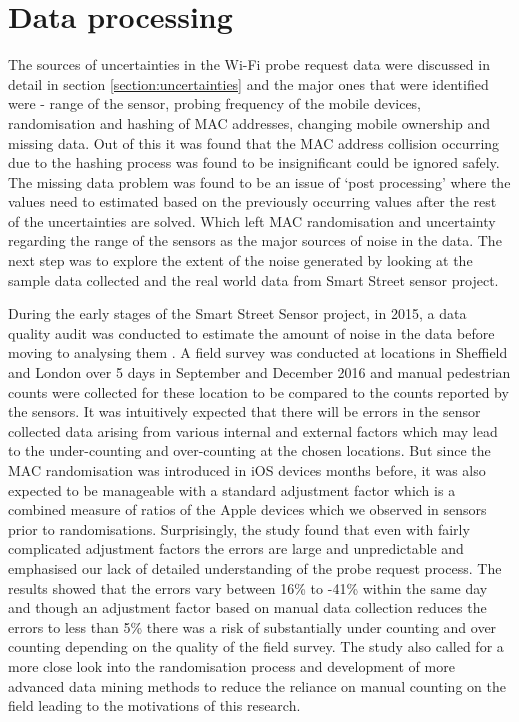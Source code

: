 \section{Data processing} \label{section:processing}

The sources of uncertainties in the Wi-Fi probe request data were discussed in detail in section \ref{section:uncertainties} and the major ones that were identified were - range of the sensor, probing frequency of the mobile devices, randomisation and hashing of MAC addresses, changing mobile ownership and missing data.
Out of this it was found that the MAC address collision occurring due to the hashing process was found to be insignificant could be ignored safely.
The missing data problem was found to be an issue of `post processing' where the values need to estimated based on the previously occurring values after the rest of the uncertainties are solved.
Which left MAC randomisation and uncertainty regarding the range of the sensors as the major sources of noise in the data.
The next step was to explore the extent of the noise generated by looking at the sample data collected and the real world data from Smart Street sensor project.

During the early stages of the Smart Street Sensor project, in 2015, a data quality audit was conducted to estimate the amount of noise in the data before moving to analysing them \cite{lugomer2017}.
A field survey was conducted at locations in Sheffield and London over 5 days in September and December 2016 and manual pedestrian counts were collected for these location to be compared to the counts reported by the sensors.
It was intuitively expected that there will be errors in the sensor collected data arising from various internal and external factors which may lead to the under-counting and over-counting at the chosen locations.
But since the MAC randomisation was introduced in iOS devices months before, it was also expected to be manageable with a standard adjustment factor which is a combined measure of ratios of the Apple devices which we observed in sensors prior to randomisations.
Surprisingly, the study found that even with fairly complicated adjustment factors the errors are large and unpredictable and emphasised our lack of detailed understanding of the probe request process.
The results showed that the errors vary between 16\% to -41\% within the same day and though an adjustment factor based on manual data collection reduces the errors to less than 5\% there was a risk of substantially under counting and over counting depending on the quality of the field survey.
The study also called for a more close look into the randomisation process and development of more advanced data mining methods to reduce the reliance on manual counting on the field leading to the motivations of this research.

